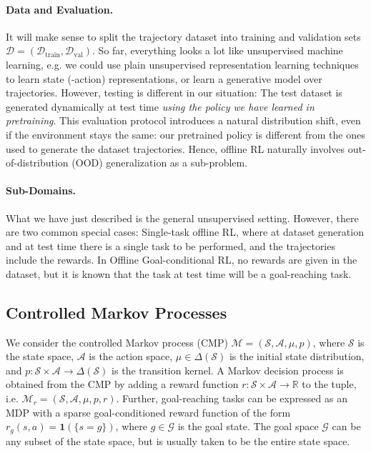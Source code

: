 \documentclass{article}
\theoremstyle{plain}
\theoremstyle{definition}
\theoremstyle{remark}
\newcommand{\sS}{\mathcal{S}}
\newcommand{\sA}{\mathcal{A}}
\newcommand{\sR}{\mathbb{R}}
\newcommand{\dist}[1]{\Delta({#1})}
\begin{document}
\paragraph{Data and Evaluation.} It will make sense to split the trajectory dataset into training and validation sets $\mathcal{D} = (\mathcal{D}_\textrm{train}, \mathcal{D}_\textrm{val})$. 
So far, everything looks a lot like unsupervised machine learning, e.g. we could use plain unsupervised representation learning  techniques to learn state (-action) representations, or learn a generative model over trajectories. 
However, testing is different in our situation: The test dataset is generated dynamically at test time \textit{using the policy we have learned in pretraining}. 
This evaluation protocol introduces a natural distribution shift, even if the environment stays the same: our pretrained policy is different from the ones used to generate the dataset trajectories. Hence, offline RL naturally involves out-of-distribution (OOD) generalization as a sub-problem.

\paragraph{Sub-Domains.} What we have just described is the general unsupervised setting. However, there are two common special cases: Single-task offline RL, where at dataset generation and at test time there is a single task to be performed, and the trajectories include the rewards. In Offline Goal-conditional RL, no rewards are given in the dataset, but it is known that the task at test time will be a goal-reaching task.

\subsection{Controlled Markov Processes}
We consider the controlled Markov process (CMP) $\mathcal{M} = (\sS, \sA, \mu, p)$, where $\sS$ is the state space, $\sA$ is the action space, $\mu\in \dist\sS$ is the initial state distribution, and $p: \sS\times\sA \to \dist\sS$ is the transition kernel. 
A Markov decision process is obtained from the CMP by adding a reward function $r:\sS\times\sA \to \sR$ to the tuple, i.e. $\mathcal{M}_r = (\sS, \sA, \mu, p, r)$. 
Further, goal-reaching tasks can be expressed as an MDP with a sparse goal-conditioned reward function of the form $r_g(s,a) = \mathbf{1}(\{s=g\})$, where $g\in\mathcal{G}$ is the goal state. 
The goal space $\mathcal{G}$ can be any subset of the state space, but is usually taken to be the entire state space.
\end{document}
